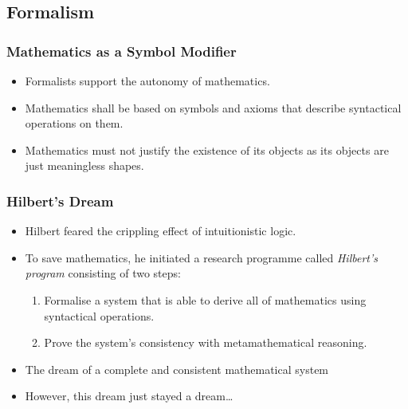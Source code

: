\documentclass{beamer}
\begin{document}
\subsection{Formalism}
\begin{frame}
    \frametitle{Mathematics as a Symbol Modifier}
    \begin{itemize}[<+->]
	\item Formalists support the autonomy of mathematics.
	\item Mathematics shall be based on symbols and axioms that describe syntactical operations on them.
	\item Mathematics must not justify the existence of its objects as its objects are just meaningless shapes.
    \end{itemize}
\end{frame}
\begin{frame}
    \frametitle{Hilbert's Dream}
    \begin{itemize}[<+->]
	\item Hilbert feared the crippling effect of intuitionistic logic.
	\item To save mathematics, he initiated a research programme called \textit{Hilbert's program} consisting of two steps:
	\begin{enumerate}
		\item Formalise a system that is able to derive all of mathematics using syntactical operations.
		\item Prove the system's consistency with metamathematical reasoning.
	\end{enumerate}
	\item The dream of a complete and consistent mathematical system
	\item However, this dream just stayed a dream\ldots
    \end{itemize}
\end{frame}
\end{document}
